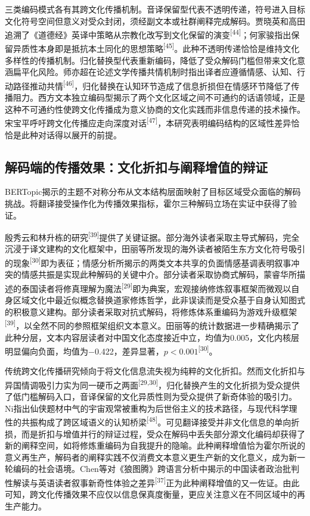 \documentclass[12pt, a4paper]{article}
\newcommand{\citemark}[1]{\textsuperscript{[#1]}}
\begin{document}
三类编码模式各有其跨文化传播机制。音译保留型代表不透明传递，符号进入目标文化符号空间但意义对受众封闭，须经副文本或社群阐释完成解码。贾晓英和高田追溯了《道德经》英译中策略从宗教化改写到文化保留的演变\citemark{44}；何家骏指出保留异质性本身即是抵抗本土同化的思想策略\citemark{45}。此种不透明传递恰恰是维持文化多样性的传播机制。归化替换型代表重新编码，降低了受众解码门槛但带来文化意涵扁平化风险。师亦超在论述文学传播共情机制时指出译者应遵循情感、认知、行动路径推动共情\citemark{46}，归化替换在认知环节造成了信息折损但在情感环节降低了传播阻力。西方文本独立编码型揭示了两个文化区域之间不可通约的话语领域，正是这种不可通约性使跨文化传播成为意义协商的文化实践而非信息传递的技术操作。宋宝平呼吁跨文化传播应走向深度对话\citemark{47}，本研究表明编码结构的区域性差异恰恰是此种对话得以展开的前提。

\subsection{解码端的传播效果：文化折扣与阐释增值的辩证}

BERTopic揭示的主题不对称分布从文本结构层面映射了目标区域受众面临的解码挑战。将翻译接受操作化为传播效果指标，霍尔三种解码立场在实证中获得了验证。

殷秀云和林升栋的研究\citemark{39}提供了关键证据。部分海外读者采取主导式解码，完全沉浸于译文建构的文化框架中，田丽等所发现的海外读者被陌生东方文化符号吸引的现象\citemark{30}即为表征；情感分析所揭示的两类文本共享的负面情感基调表明叙事冲突的情感共振是实现此种解码的关键中介。部分读者采取协商式解码，蒙睿华所描述的泰国读者将修真理解为魔法\citemark{29}即为典案，宏观接纳修炼叙事框架而微观以自身区域文化中最近似概念替换道家修炼哲学，此非误读而是受众基于自身认知图式的积极意义建构。部分读者采取对抗式解码，将修炼体系重编码为游戏升级框架\citemark{39}，以全然不同的参照框架组织文本意义。田丽等的统计数据进一步精确揭示了此种分层，文本内容层读者对中国文化态度接近中立，均值为0.005，文化内核层明显偏向负面，均值为$-$0.422，差异显著，$p < 0.001$\citemark{30}。

传统跨文化传播研究倾向于将文化信息流失视为纯粹的文化折扣。然而文化折扣与异国情调吸引力实为同一硬币之两面\citemark{29,30}，归化替换产生的文化折损为受众提供了低门槛解码入口，音译保留的文化异质性则为受众提供了新奇体验的吸引力。Ni指出仙侠题材中气的宇宙观常被重构为后世俗主义的技术路径，与现代科学理性的共振构成了跨区域语义的认知桥梁\citemark{48}。可见翻译接受并非文化信息的单向折损，而是折扣与增值并行的辩证过程，受众在解码中丢失部分源文化编码却获得了新的阐释空间，如将修炼重编码为自我提升的隐喻。此种阐释增值恰为霍尔所说的意义再生产，解码者的阐释实践不仅消费文本意义更生产新的文化意义，成为新一轮编码的社会语境。Chen等对《狼图腾》跨语言分析中揭示的中国读者政治批判性解读与英语读者叙事新奇性体验之差异\citemark{37}正为此种阐释增值的又一佐证。由此可知，跨文化传播效果不应仅以信息保真度衡量，更应关注意义在不同区域中的再生产能力。
\end{document}

